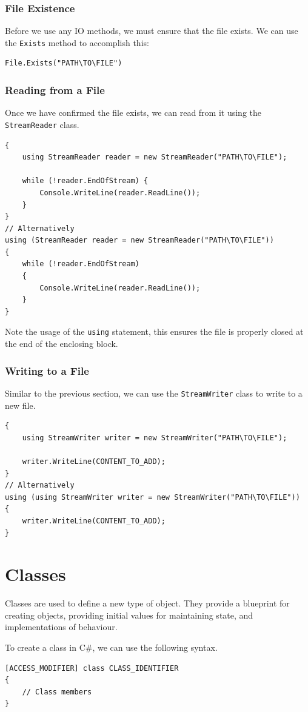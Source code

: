 \documentclass{article}
\begin{document}
\subsubsection{File Existence}
Before we use any IO methods, we must ensure that the file exists. 
We can use the \lstinline{Exists} method to accomplish this:
\begin{lstlisting}[numbers=none]
File.Exists("PATH\TO\FILE")
\end{lstlisting}
\subsubsection{Reading from a File}
Once we have confirmed the file exists, we can read from it using the \lstinline{StreamReader} class.
\begin{lstlisting}[numbers=none]
{
    using StreamReader reader = new StreamReader("PATH\TO\FILE");

    while (!reader.EndOfStream) {
        Console.WriteLine(reader.ReadLine());
    }
}
// Alternatively
using (StreamReader reader = new StreamReader("PATH\TO\FILE"))
{
    while (!reader.EndOfStream)
    {
        Console.WriteLine(reader.ReadLine());
    }
}
\end{lstlisting}
Note the usage of the \lstinline{using} statement, this ensures the file is properly closed at the end 
of the enclosing block.
\subsubsection{Writing to a File}
Similar to the previous section, we can use the \lstinline{StreamWriter} class to write to a new file.
\begin{lstlisting}[numbers=none]
{
    using StreamWriter writer = new StreamWriter("PATH\TO\FILE");

    writer.WriteLine(CONTENT_TO_ADD);
}
// Alternatively
using (using StreamWriter writer = new StreamWriter("PATH\TO\FILE"))
{
    writer.WriteLine(CONTENT_TO_ADD);
}
\end{lstlisting}
\section{Classes}
Classes are used to define a new type of object. They provide a blueprint for creating objects,
providing initial values for maintaining state, and implementations of behaviour.

To create a class in C\#, we can use the following syntax.
\begin{lstlisting}[numbers=none]
[ACCESS_MODIFIER] class CLASS_IDENTIFIER 
{
    // Class members
}     
\end{lstlisting}
\end{document}
